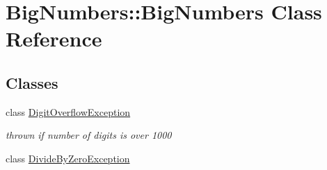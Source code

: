 \hypertarget{class_big_numbers_1_1_big_numbers}{}\section{Big\+Numbers\+::Big\+Numbers Class Reference}
\label{class_big_numbers_1_1_big_numbers}
\subsection*{Classes}
\begin{DoxyCompactItemize}
\item 
class \mbox{\hyperlink{class_big_numbers_1_1_big_numbers_1_1_digit_overflow_exception}{Digit\+Overflow\+Exception}}
\begin{DoxyCompactList}\small\item\em thrown if number of digits is over 1000 \end{DoxyCompactList}\item 
class \mbox{\hyperlink{class_big_numbers_1_1_big_numbers_1_1_divide_by_zero_exception}{Divide\+By\+Zero\+Exception}}
\end{DoxyCompactItemize}
